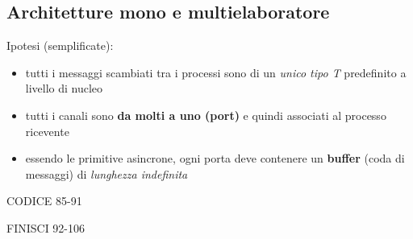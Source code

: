 \subsection{Architetture mono e multielaboratore}
Ipotesi (semplificate):
\begin{itemize}
    \item tutti i messaggi scambiati tra i processi sono di un \textit{unico tipo T} predefinito a livello di nucleo
    \item tutti i canali sono \textbf{da molti a uno (port)} e quindi associati al processo ricevente
    \item essendo le primitive asincrone, ogni porta deve contenere un \textbf{buffer} (coda di messaggi) di \textit{lunghezza indefinita}
\end{itemize}

\noindent
CODICE 85-91

FINISCI 92-106







































